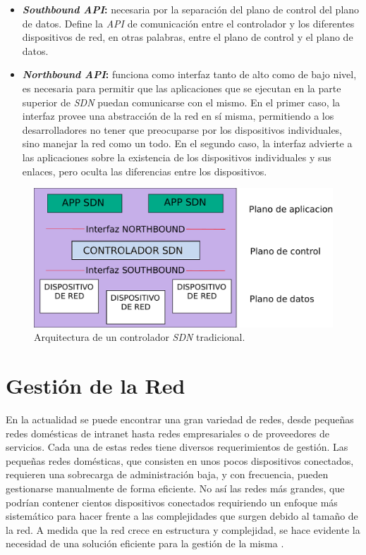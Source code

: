 \begin{itemize}
	\item \textbf{\textit{Southbound API}:} necesaria por la separación del plano de control del plano de datos. Define la \textit{API} de comunicación entre el controlador y los diferentes dispositivos de red, en otras palabras, entre el plano de control y el plano de datos.  
	\item \textbf{\textit{Northbound API}:} funciona como interfaz tanto de alto como de bajo nivel, es necesaria para permitir que las aplicaciones que se ejecutan en la parte superior de \textit{SDN} puedan comunicarse con el mismo. En el primer caso, la interfaz provee una abstracción de la red en sí misma, permitiendo a los desarrolladores no tener que preocuparse por los dispositivos individuales, sino manejar la red como un todo. En el segundo caso, la interfaz advierte a las aplicaciones sobre la existencia de los dispositivos individuales y sus enlaces, pero oculta las diferencias entre los dispositivos. 
\end{itemize}


\begin{figure}[htbp]
	\centering
	\includegraphics[scale=0.6]{Figures/arquitectura-controlador.pdf}
	\caption{Arquitectura de un controlador \textit{SDN} tradicional.}
	\label{fig:arquitectura_sdn}
  \end{figure}

\section{Gestión de la Red} \label{sec:gestionred}
En la actualidad se puede encontrar una gran variedad de redes, desde pequeñas redes domésticas de intranet hasta redes empresariales o de proveedores de servicios. Cada una de estas redes tiene diversos requerimientos de gestión.  Las pequeñas redes domésticas, que consisten en unos pocos dispositivos conectados, requieren una sobrecarga de administración baja, y con frecuencia, pueden gestionarse manualmente de forma eficiente. No así las redes más grandes, que podrían contener cientos dispositivos conectados requiriendo un enfoque más sistemático para hacer frente a las complejidades que surgen debido al tamaño de la red. A medida que la red crece en estructura y complejidad, se hace evidente la necesidad de una solución eficiente para la gestión de la misma \parencite{gestionderedes}.


